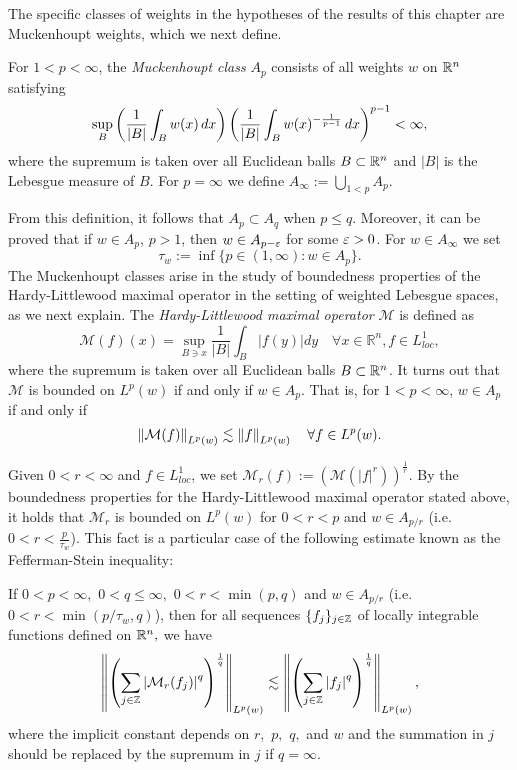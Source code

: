 The specific classes of weights in the hypotheses of the results of this chapter are Muckenhoupt weights, which we next define. 
\begin{dfn}
For $1<p<\infty$, the \textit{Muckenhoupt class} $A_p$ consists of all weights $w$ on ${{\mathbb R}^n}$ satisfying 
 \begin{equation*}
 \sup_B\left(\frac{1}{\left\vert B \right\vert}\int_Bw(x)\, dx\right)\left(\frac{1}{\left\vert B \right\vert}\int_Bw(x)^{-\frac{1}{p-1}}\, dx\right)^{p-1}<\infty,
 \end{equation*}
where the supremum is taken over all Euclidean balls $B\subset{{\mathbb R}^n}$ and $|B|$ is the Lebesgue measure of $B$. For $p=\infty$ we define $A_\infty := \bigcup\limits_{1<p} A_p$. 
\end{dfn} 
From this definition, it follows that $A_p \subset A_q$ when $p\leq q$. Moreover, it can be proved that if $w\in A_p$, $p>1$, then $w\in A_{p-\varepsilon}$ for some $\varepsilon > 0$. 
For $w\in A_\infty$ we set 
$$\tau_w := \inf\{p \in (1,\infty): w\in A_p \}.$$
\indent The Muckenhoupt classes arise in the study of boundedness properties of the Hardy-Littlewood maximal operator in the setting of weighted Lebesgue spaces, as we next explain. The \textit{Hardy-Littlewood maximal operator} $\mathcal{M}$ is defined as 
\[ \mathcal{M}(f)(x)  = \sup_{B \ni x} \frac{1}{|B|}\int_B |f(y)|dy \quad \forall x\in\mathbb{R}^n, f\in L^1_{loc}, \]
where the supremum is taken over all Euclidean balls $B \subset {{\mathbb R}^n}$. It turns out that $\mathcal{M}$ is bounded on $L^p(w)$ if and only if $w\in A_p$. That is, for $1<p<\infty$, $w\in A_p$ if and only if 
\[\left\|\mathcal{M}(f)\right\|_{L^p (w)} \lesssim \left\|f\right\|_{L^p (w)} \quad \forall f\in L^p(w). \]


Given $0<r<\infty$ and $f\in L^1_{loc}$, we set $\mathcal{M}_r (f) := \left(\mathcal{M}(|f|^r)\right)^{\frac{1}{r}}$. By the boundedness properties for the Hardy-Littlewood maximal operator stated above, it holds that $\mathcal{M}_r$ is bounded on $L^p (w)$ for $0<r<p$ and $w\in A_{p/r}$ (i.e. $0<r<\frac{p}{\tau_w}$). This fact is a particular case of the following estimate known as the Fefferman-Stein inequality:


\noindent If $0<p<\infty,$ $0<q\le \infty,$  $0<r <\min(p,q)$ and $w \in A_{p/r}$ (i.e. $0<r<\min(p/\tau_w,q)$), then for all sequences $\{f_{j}\}_{j\in\mathbb{Z}}$ of locally integrable functions defined on ${{\mathbb R}^n},$ we have
 \begin{equation}\label{eq:wFS}
 \left\|\left(\sum_{j\in\mathbb{Z}}\left\vert \mathcal{M}_r (f_j) \right\vert^q\right)^{\frac{1}{q}}\right\|_{L^{p}(w)}\lesssim
 \left\|\left(\sum_{j\in\mathbb{Z}}\left\vert f_j \right\vert^q\right)^{\frac{1}{q}}\right\|_{L^{p}(w)},
 \end{equation}
where the implicit constant depends on $r,$ $p,$ $q,$ and $w$ and the summation in $j$ should be replaced by the supremum in $j$ if $q=\infty.$



